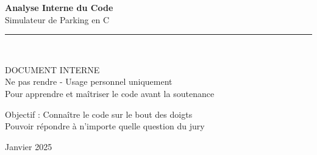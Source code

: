 \documentclass[11pt,a4paper]{article}
\begin{document}
\begin{titlepage}

    \vspace*{5cm}

    \begin{center}
        {\Huge\bfseries\textcolor{dark}{Analyse Interne du Code}}\\[0.5cm]
        {\LARGE\textcolor{primary}{Simulateur de Parking en C}}\\[1.5cm]

        \textcolor{accent}{\rule{10cm}{2pt}}\\[1.5cm]

        \begin{tcolorbox}[
            width=12cm,
            colback=accent!10,
            colframe=accent,
            arc=5pt,
            boxrule=2pt,
            halign=center
        ]
            {\Large\textcolor{accent}{ DOCUMENT INTERNE}}\\[0.3cm]
            {\large\textcolor{dark}{Ne pas rendre - Usage personnel uniquement}}\\[0.2cm]
            \textcolor{dark}{Pour apprendre et maîtriser le code avant la soutenance}
        \end{tcolorbox}

        \vspace{2cm}

        {\large\textcolor{dark}{
             Objectif : Connaître le code sur le bout des doigts\\[0.3cm]
             Pouvoir répondre à n'importe quelle question du jury
        }}

        \vfill

        \textcolor{dark}{ Janvier 2025}
    \end{center}
\end{titlepage}
\end{document}
